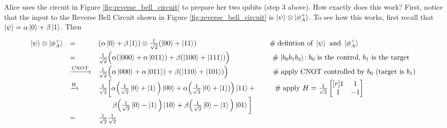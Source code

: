 \documentclass{article}
\theoremstyle{definition}
\begin{document}
\bigskip
\noindent
Alice uses the circuit in Figure \ref{fig:reverse_bell_circuit}
to prepare her two qubits (step 3 above). How exactly does this work? 
First, notice that the input to the Reverse Bell Circuit shown in 
Figure \ref{fig:reverse_bell_circuit} is $\ket{\psi} \otimes \ket{\phi^{+}_A}$. 
To see how this works, first recall that $\ket{\psi} = \alpha \ket{0} + \beta \ket{1}$.  
Then 




{\footnotesize
\begin{equation*}
\begin{array}{llllll}
\ket{\psi} \otimes \ket{\phi^{+}_A} 
&=& (\alpha \ket{0} + \beta \ket{1}) \otimes \frac{1}{\sqrt{2}} (\ket{00} + \ket{11})
		\hspace{3.5cm} \mathrel{\#} \text{defintion of } \ket{\psi} \text{ and } \ket{\phi^{+}_A} \\
[5pt]
&=& \frac{1}{\sqrt{2}} \Big ( \alpha (\ket{000} + \alpha \ket{011}) + \beta (\ket{100} + \ket{111}) \Big )
		\hspace{2.0cm} \mathrel{\#} \ket{b_0b_1b_2}\!: b_0 \text{ is the control, } b_1  \text{ is the target} \\
[5pt]
&\xrightarrow {\scriptsize \text{CNOT}}& \frac{1}{\sqrt{2}} \Big ( \alpha \ket{000} + \alpha \ket{011}) + 
		\beta (\ket{110} + \ket{101}) \Big ) 
		\hspace{2.1cm} \mathrel{\#} \text{apply CNOT controlled by $b_0$ (target is $b_1$)} \\
[5pt]
&\xrightarrow {\scriptsize \text{H}}&\frac{1}{\sqrt{2}} \bigg [ \alpha 
		\Big ( \frac{1}{\sqrt{2}} \ket{0} + \ket{1} \Big ) \ket{00} + 
		\alpha \Big (  \frac{1}{\sqrt{2}} \ket{0} + \ket{1}) \Big )  \ket{11} + 
		\hspace{0.90cm} \mathrel{\#} \text{apply } H = \frac{1}{\sqrt{2}}  \begin{bmatrix}[r] 1 & 1 \\ 1 &  -1 \end{bmatrix}  \\
		&& \qquad \beta \Big ( \frac{1}{\sqrt{2}} \ket{0} - \ket{1} \Big ) \ket{10} + 
		\beta \Big (  \frac{1}{\sqrt{2}} \ket{0} - \ket{1} \Big )  \ket{01}  \bigg ] \\
[5pt]
&=&\frac{1}{\sqrt{2}} \frac{1}{\sqrt{2}}  

\end{array}
\end{equation*}}
\end{document}
